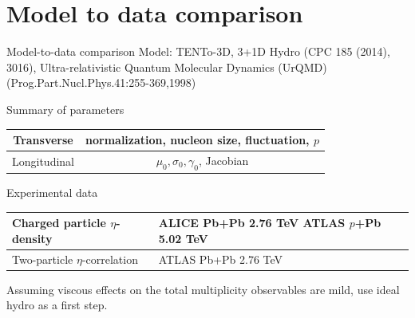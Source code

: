 \documentclass[11pt]{beamer}
\begin{document}
\section{Model to data comparison}
\begin{frame}{Model-to-data comparison}
Model: TENTo-3D, 3+1D Hydro {\tiny (CPC 185 (2014), 3016)}, Ultra-relativistic Quantum Molecular Dynamics (UrQMD) {\tiny (Prog.Part.Nucl.Phys.41:255-369,1998)}


\begin{center}
Summary of parameters
\begin{tabular}{c|c}
\hline 
Transverse & normalization, nucleon size, fluctuation, $p$ \\ 
\hline 
Longitudinal & $\mu_0,\sigma_0, \gamma_0$, Jacobian \\ 
\hline 
\end{tabular} 
\end{center}

\begin{center}
Experimental data
\begin{tabularx}{0.8\textwidth}{p{4.5cm}|p{4cm}}
\hline
 Charged particle $\eta$-density & ALICE Pb+Pb 2.76 TeV ATLAS $p$+Pb 5.02 TeV \\ 
\hline
Two-particle $\eta$-correlation & ATLAS Pb+Pb 2.76 TeV \\
\hline
\end{tabularx}
\end{center}

Assuming viscous effects on the total multiplicity observables are mild, use ideal hydro as a first step.
\end{frame}
\end{document}
